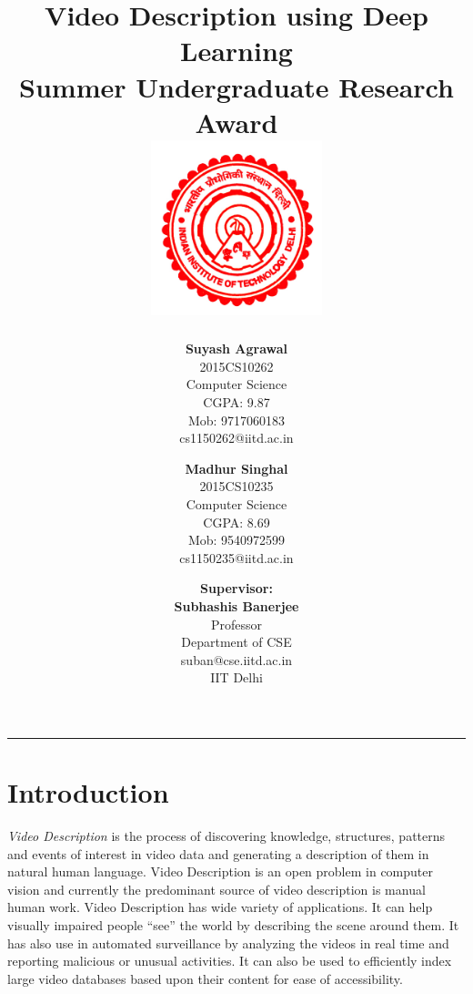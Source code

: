 \documentclass[12pt]{article}
\title{\vspace*{\fill} \textbf{Video Description using Deep Learning}
	  \\ {\large \textbf{Summer Undergraduate Research Award}}
	  \\  \vspace{3mm} \includegraphics[width=5cm]{logo.jpg}}
\author{
	\textbf{Suyash Agrawal}\\ 
	2015CS10262\\
	Computer Science\\
	CGPA: 9.87 \\
	Mob: 9717060183\\
	cs1150262@iitd.ac.in
	\and
	\textbf{Madhur Singhal}\\ 
	2015CS10235\\
	Computer Science\\
	CGPA: 8.69\\
	Mob: 9540972599\\
	cs1150235@iitd.ac.in
}
\date{\textbf{Supervisor:} \\ \textbf{Subhashis Banerjee} \\ Professor \\ Department of CSE \\ suban@cse.iitd.ac.in\\ IIT Delhi\\
\vspace*{\fill}}
\begin{document}
	\maketitle

\begin{center}
\noindent\rule{3.2cm}{0.4pt} 
\end{center}

	\newpage

	\section{Introduction}
		\textit{Video Description} is the process of discovering knowledge, structures, patterns and events of interest in video data and generating a description of them in natural human language. Video Description is an open problem in computer vision and currently the predominant source of video description is manual human work. 
		\newline
		Video Description has wide variety of applications. It can help visually impaired people ``see'' the world by describing the scene around them. It has also use in automated surveillance by analyzing the videos in real time and reporting malicious or unusual activities. It can also be used to efficiently index large video databases based upon their content for ease of accessibility.
\end{document}
